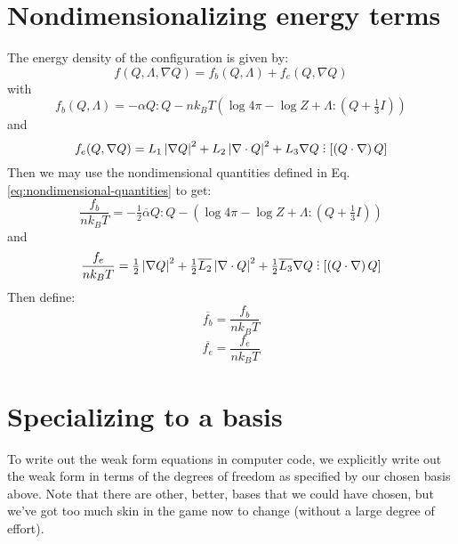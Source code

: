 \documentclass[reqno]{article}
\begin{document}
\section{Nondimensionalizing energy terms}
The energy density of the configuration is given by:
\begin{equation}
    f(Q, \Lambda, \nabla Q)
    = 
    f_b (Q, \Lambda)
    + f_e (Q, \nabla Q)
\end{equation}
with
\begin{equation}
    f_b(Q, \Lambda)
    =
    - \alpha Q : Q - n k_B T \left( \log 4 \pi - \log Z + \Lambda : (Q + \tfrac13 I) \right)
\end{equation}
and
\begin{equation}
    f_e (Q, \nabla Q)
    =
    L_1 \left| \nabla Q \right|^2
    + L_2 \left| \nabla \cdot Q \right|^2
    + L_3 \nabla Q \divby \left[ \left( Q \cdot \nabla \right) Q \right]
\end{equation}
Then we may use the nondimensional quantities defined in Eq. \eqref{eq:nondimensional-quantities} to get:
\begin{equation}
    \frac{f_b}{n k_B T} 
    = 
    - \tfrac12 \overline{\alpha} Q : Q 
    - \left( \log 4 \pi - \log Z + \Lambda : \left( Q + \tfrac13 I \right) \right)
\end{equation}
and
\begin{equation}
    \frac{f_e}{n k_B T} 
    = 
    \tfrac12 \left| \nabla Q \right|^2
    + \tfrac12 \overline{L_2} \left| \nabla \cdot Q \right|^2
    + \tfrac12 \overline{L_3} \nabla Q \divby \left[ \left( Q \cdot \nabla \right) Q \right]
\end{equation}
Then define:
\begin{equation}
    \overline{f_b} = \frac{f_b}{n k_B T}
\end{equation}
\begin{equation}
    \overline{f_e} = \frac{f_e}{n k_B T}
\end{equation}

\section{Specializing to a basis}
To write out the weak form equations in computer code, we explicitly write out the weak form in terms of the degrees of freedom as specified by our chosen basis above.
Note that there are other, better, bases that we could have chosen, but we've got too much skin in the game now to change (without a large degree of effort).
\end{document}
